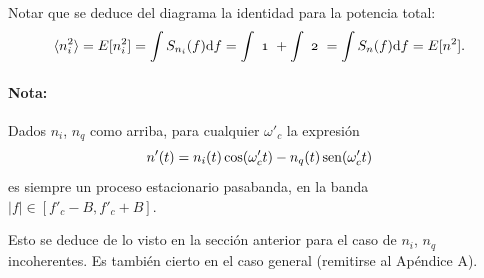 \FloatBarrier
 Notar que se deduce del diagrama la identidad para la potencia total:
\[\langle{n_i^2}\rangle=E[n_i^2]
=\int S_{n_i}(f)\d f= \int \text{ \oldstylenums{1} }  + \int
\text{ \oldstylenums{2} } = \int S_n(f)\d f=E[n^2].\]



\paragraph{Nota:} Dados $n_i$, $n_q$ como arriba, para cualquier $\omega'_c$ la expresión
\[n'(t)=n_i(t)\cos(\omega'_ct)-n_q(t)\operatorname{sen}(\omega'_ct)\]
es siempre un proceso estacionario pasabanda, en la banda
$|f|\in[f'_c-B,f'_c+B]$.

Esto se deduce de lo visto en la sección anterior para el
caso de $n_i$, $n_q$ incoherentes. Es también cierto en el caso general
(remitirse al Apéndice A).

